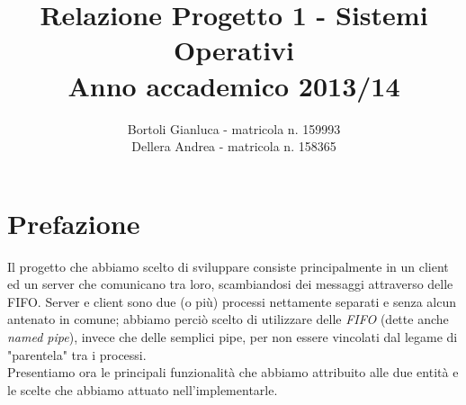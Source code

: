 \documentclass[a4paper,9pt]{article}
\begin{document}
\author{Bortoli Gianluca - matricola n. 159993\\Dellera Andrea - matricola n. 158365}
\title{Relazione Progetto 1 - Sistemi Operativi \\Anno accademico 2013/14}
\maketitle
\pagebreak

\section{Prefazione}
Il progetto che abbiamo scelto di sviluppare consiste principalmente in un client ed un server che comunicano tra loro, scambiandosi dei messaggi attraverso delle FIFO. Server e client sono due (o più) processi nettamente separati e senza alcun antenato in comune; abbiamo perciò scelto di utilizzare delle \emph{FIFO} (dette anche \emph{named pipe}), invece che delle semplici pipe, per non essere vincolati dal legame di "parentela" tra i processi.\\
Presentiamo ora le principali funzionalità che abbiamo attribuito alle due entità e le scelte che abbiamo attuato nell'implementarle.
\end{document}
